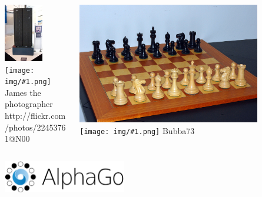 \documentclass[12pt]{beamer}
\newcommand{\cc}[1]{\texttt{[image: img/\#1.png]}\hspace{1mm}}
\begin{document}
\begin{frame}
{\begin{columns}
\begin{column}{0.5 \textwidth}
\begin{center}
          \includegraphics[width=0.6\textwidth]{img/deep_blue.jpg} \\
          \tiny \cc{by} James the photographer \\ http://flickr.com/photos/22453761@N00
        \end{center}
      \end{column}
      \begin{column}{0.5 \textwidth}
        \begin{center}
          \includegraphics[width=0.8\textwidth]{img/chess.jpg} \\
          \tiny \cc{by-sa} Bubba73
        \end{center}
      \end{column}
    \end{columns}
  }
   {
    \begin{center}
      \includegraphics[width=0.4\textwidth]{img/alpha_go.png} \\


\end{center}}
\end{frame}
\end{document}
